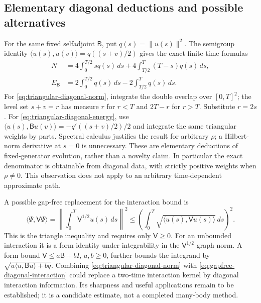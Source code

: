\documentclass[11pt]{article}
\numberwithin{equation}{section}
\theoremstyle{definition}
\theoremstyle{remark}
\begin{document}
\subsection{Elementary diagonal deductions and possible alternatives}
For the same fixed selfadjoint $\mathsf B$, put $q(s)=\|u(s)\|^2$.
The semigroup identity
$\langle u(s),u(v)\rangle=q((s+v)/2)$ gives the exact finite-time
formulas
\begin{align}
 N&=4\int_0^{T/2}s q(s)\,ds
       +4\int_{T/2}^T(T-s)q(s)\,ds,
       \label{eq:triangular-diagonal-norm}\\
 E_{\mathsf B}&=2\int_0^{T/2}q(s)\,ds
                  -2\int_{T/2}^Tq(s)\,ds.
       \label{eq:triangular-diagonal-energy}
\end{align}
For \eqref{eq:triangular-diagonal-norm}, integrate the double overlap
over $[0,T]^2$; the level set $s+v=r$ has measure $r$ for $r<T$
and $2T-r$ for $r>T$.  Substitute $r=2s$.
For \eqref{eq:triangular-diagonal-energy}, use
$\langle u(s),\mathsf B u(v)\rangle=-q'((s+v)/2)/2$ and integrate
the same triangular weights by parts.  Spectral calculus justifies
the result for arbitrary $\rho$; a Hilbert-norm derivative at $s=0$
is unnecessary.  These are elementary deductions of fixed-generator
evolution, rather than a novelty claim.  In particular the exact
denominator is obtainable from diagonal data, with strictly positive
weights when $\rho\ne0$.  This observation does not apply to an
arbitrary time-dependent approximate path.

A possible gap-free replacement for the interaction bound is
\begin{equation}\label{eq:gapfree-diagonal-interaction}
 \langle\Psi,\mathsf V\Psi\rangle
 =\left\|\int_0^T\mathsf V^{1/2}u(s)\,ds\right\|^2
 \le\left(\int_0^T
       \sqrt{\langle u(s),\mathsf V u(s)\rangle}\,ds\right)^2.
\end{equation}
This is the triangle inequality and requires only $\mathsf V\ge0$.
For an unbounded interaction it is a form identity under integrability
in the $\mathsf V^{1/2}$ graph norm.  A form bound
$\mathsf V\le a\mathsf B+bI$, $a,b\ge0$, further bounds the
integrand by
$\sqrt{a\langle u,\mathsf B u\rangle+bq}$.
Combining \eqref{eq:triangular-diagonal-norm} with
\eqref{eq:gapfree-diagonal-interaction} could replace a two-time
interaction kernel by diagonal interaction information.  Its sharpness
and useful applications remain to be established; it is a candidate
estimate, not a completed many-body method.
\end{document}
